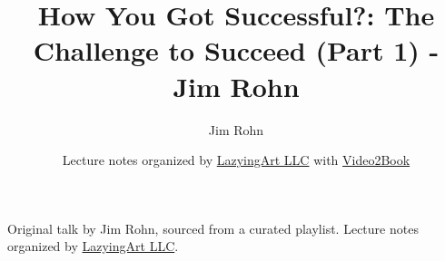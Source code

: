 \documentclass[11pt,oneside]{book}
\begin{document}
\frontmatter
\title{How You Got Successful?: The Challenge to Succeed (Part 1) - Jim Rohn}
\author{Jim Rohn}
\date{Lecture notes organized by \href{https://lazying.art}{LazyingArt LLC} with \href{https://github.com/lachlanchen/Video2Book}{Video2Book}}
\maketitle
\begin{center}
\small Original talk by Jim Rohn, sourced from a curated playlist. Lecture notes organized by \href{https://lazying.art}{LazyingArt LLC}.
\end{center}
\clearpage
\mainmatter

\end{document}
